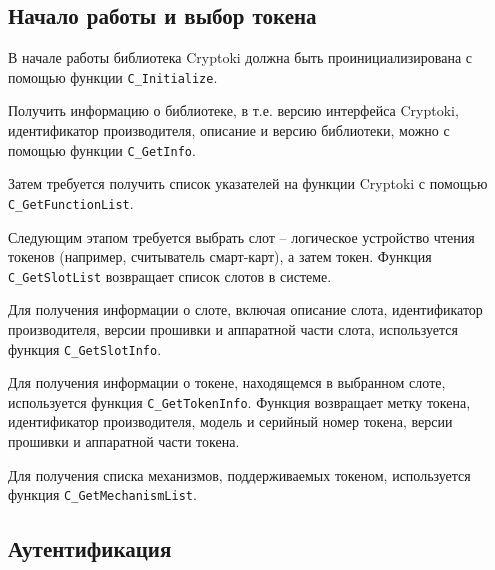 \subsection{Начало работы и выбор токена}

В начале работы библиотека Cryptoki должна быть
проинициализирована с помощью функции \verb|C_Initialize|.

Получить информацию о библиотеке, в т.е. версию интерфейса
Cryptoki, идентификатор производителя, описание и версию
библиотеки, можно с помощью функции \verb|C_GetInfo|.

Затем требуется получить список указателей на функции Cryptoki
с помощью \verb|C_GetFunctionList|.

Следующим этапом требуется выбрать слот -- логическое
устройство чтения токенов (например, считыватель смарт-карт),
а затем токен.
Функция \verb|C_GetSlotList| возвращает список слотов в системе.

Для получения информации о слоте, включая описание слота,
идентификатор производителя, версии прошивки и аппаратной
части слота, используется функция \verb|C_GetSlotInfo|.

Для получения информации о токене, находящемся в выбранном
слоте, используется функция \verb|C_GetTokenInfo|.
Функция возвращает метку токена, идентификатор производителя,
модель и серийный номер токена, версии прошивки и
аппаратной части токена.

Для получения списка механизмов, поддерживаемых токеном,
используется функция \verb|C_GetMechanismList|.


\subsection{Аутентификация}


